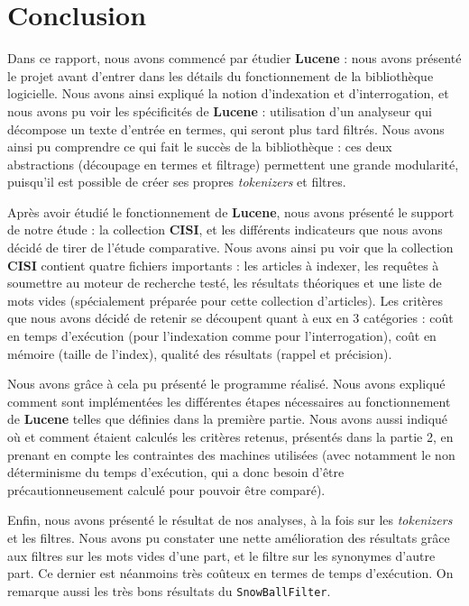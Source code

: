 \section*{Conclusion}

Dans ce rapport, nous avons commencé par étudier \textbf{Lucene} : nous avons présenté le projet avant d'entrer dans les détails du fonctionnement de la bibliothèque logicielle. Nous avons ainsi expliqué la notion d'indexation et d'interrogation, et nous avons pu voir les spécificités de \textbf{Lucene} : utilisation d'un analyseur qui décompose un texte d'entrée en termes, qui seront plus tard filtrés. Nous avons ainsi pu comprendre ce qui fait le succès de la bibliothèque : ces deux abstractions (découpage en termes et filtrage) permettent une grande modularité, puisqu'il est possible de créer ses propres \textit{tokenizers} et filtres.

Après avoir étudié le fonctionnement de \textbf{Lucene}, nous avons présenté le support de notre étude : la collection \textbf{CISI}, et les différents indicateurs que nous avons décidé de tirer de l'étude comparative. Nous avons ainsi pu voir que la collection \textbf{CISI} contient quatre fichiers importants : les articles à indexer, les requêtes à soumettre au moteur de recherche testé, les résultats théoriques et une liste de mots vides (spécialement préparée pour cette collection d'articles). Les critères que nous avons décidé de retenir se découpent quant à eux en 3 catégories : coût en temps d'exécution (pour l'indexation comme pour l'interrogation), coût en mémoire (taille de l'index), qualité des résultats (rappel et précision).

Nous avons grâce à cela pu présenté le programme réalisé. Nous avons expliqué comment sont implémentées les différentes étapes nécessaires au fonctionnement de \textbf{Lucene} telles que définies dans la première partie. Nous avons aussi indiqué où et comment étaient calculés les critères retenus, présentés dans la partie 2, en prenant en compte les contraintes des machines utilisées (avec notamment le non déterminisme du temps d'exécution, qui a donc besoin d'être précautionneusement calculé pour pouvoir être comparé).

Enfin, nous avons présenté le résultat de nos analyses, à la fois sur les \textit{tokenizers} et les filtres. Nous avons pu constater une nette amélioration des résultats grâce aux filtres sur les mots vides d'une part, et le filtre sur les synonymes d'autre part. Ce dernier est néanmoins très coûteux en termes de temps d'exécution. On remarque aussi les très bons résultats du \texttt{SnowBallFilter}.


